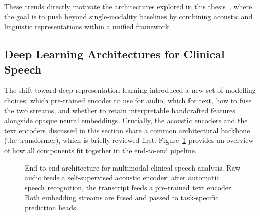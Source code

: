 These trends directly motivate the architectures explored in this thesis~\cite{esteve2025speechadppa}, where the goal is to push beyond single-modality baselines by combining acoustic and linguistic representations within a unified framework.

\subsection{Deep Learning Architectures for Clinical Speech}
\label{sec:sota_architectures}

The shift toward deep representation learning introduced a new set of modelling choices: which pre-trained encoder to use for audio, which for text, how to fuse the two streams, and whether to retain interpretable handcrafted features alongside opaque neural embeddings.
Crucially, the acoustic encoders and the text encoders discussed in this section share a common architectural backbone (the transformer), which is briefly reviewed first.
Figure~\ref{fig:pipeline_overview} provides an overview of how all components fit together in the end-to-end pipeline.

\begin{figure}[H]
    \centering
    \caption[Multimodal speech pipeline]{End-to-end architecture for multimodal clinical speech analysis. Raw audio feeds a self-supervised acoustic encoder; after automatic speech recognition, the transcript feeds a pre-trained text encoder. Both embedding streams are fused and passed to task-specific prediction heads.}
    \label{fig:pipeline_overview}
\end{figure}

